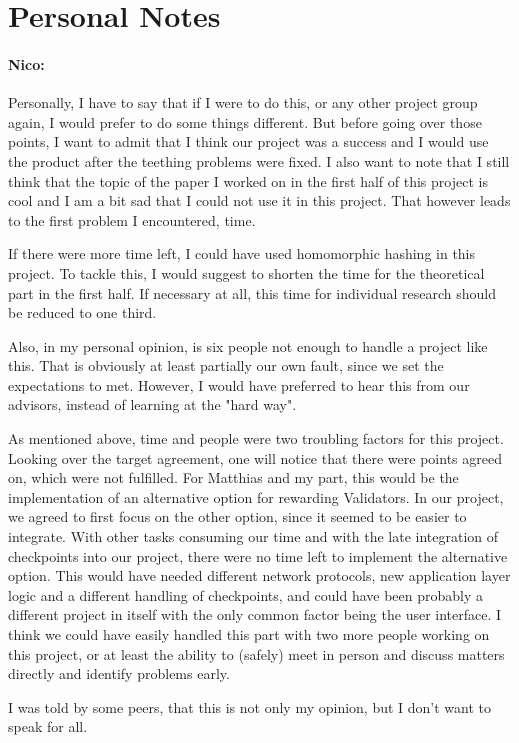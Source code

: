 \section{Personal Notes}
\paragraph{Nico:} Personally, I have to say that if I were to do this, or any other project group again, I would prefer to do some things different. But before going over those points, I want to admit that I think our project was a success and I would use the product after the teething problems were fixed. I also want to note that I still think that the topic of the paper I worked on in the first half of this project is cool and I am a bit sad that I could not use it in this project. That however leads to the first problem I encountered, time.

If there were more time left, I could have used homomorphic hashing in this project. To tackle this, I would suggest to shorten the time for the theoretical part in the first half. If necessary at all, this time for individual research should be reduced to one third. 

Also, in my personal opinion, is six people not enough to handle a project like this. That is obviously at least partially our own fault, since we set the expectations to met. However, I would have preferred to hear this from our advisors, instead of learning at the "hard way". 

As mentioned above, time and people were two troubling factors for this project. Looking over the target agreement, one will notice that there were points agreed on, which were not fulfilled. For Matthias and my part, this would be the implementation of an alternative option for rewarding Validators. In our project, we agreed to first focus on the other option, since it seemed to be easier to integrate. With other tasks consuming our time and with the late integration of checkpoints into our project, there were no time left to implement the alternative option. This would have needed different network protocols, new application layer logic and a different handling of checkpoints, and could have been probably a different project in itself with the only common factor being the user interface. I think we could have easily handled this part with two more people working on this project, or at least the ability to (safely) meet in person and discuss matters directly and identify problems early.

I was told by some peers, that this is not only my opinion, but I don't want to speak for all.